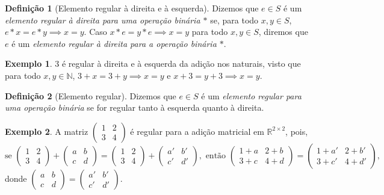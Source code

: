 \documentclass[a4paper,12pt]{article}
\theoremstyle{plain}
\theoremstyle{definition}
\newtheorem{definicao}{Definição}[section]
\newtheorem{exemplo}{Exemplo}[section]
\begin{document}
\begin{definicao}[Elemento regular à direita e à esquerda]
	Dizemos que \(e\in S\) é um \emph{elemento regular à direita para uma operação binária $*$} se, para todo $x,y \in S$, \(e*x = e*y \implies x = y\). Caso \(x*e = y*e \implies x = y\) para todo $x,y\in S$, diremos que $e$ é um \emph{elemento regular à direita para a operação binária $*$}.
\end{definicao}

\begin{exemplo}
	$3$ é regular à direita e à esquerda da adição nos naturais, visto que para todo $x,y\in \mathbb{N}$, $3+x = 3 + y \implies x = y$ e $x + 3 = y+3 \implies x =y$.
\end{exemplo}

\begin{definicao}[Elemento regular]
	Dizemos que \(e\in S\) é um \emph{elemento regular para uma operação binária} se for regular tanto à esquerda quanto à direita.
\end{definicao}

\begin{exemplo}
	A matriz $\begin{pmatrix}
		1&2\\
		3&4
	\end{pmatrix}$ é regular para a adição matricial em $\mathbb{R}^{2\times 2}$, pois,
	$
	\text{se }
	\begin{pmatrix}
		1&2\\
		3&4
	\end{pmatrix}
	+ \begin{pmatrix}
		a&b\\c&d
	\end{pmatrix}
	=\begin{pmatrix}
		1&2\\3&4
	\end{pmatrix}
	+ \begin{pmatrix}
		a'&b'\\c'&d'
	\end{pmatrix}, \text{ então }
	\begin{pmatrix}
		1+a&2+b\\3+c&4+d
	\end{pmatrix}
	= \begin{pmatrix}
		1+a'&2+b'\\3+c'&4+d'
	\end{pmatrix},
	$
	donde $\begin{pmatrix}
		a&b\\c&d
	\end{pmatrix}
	= \begin{pmatrix}
		a'&b'\\c'&d'
	\end{pmatrix}$.
\end{exemplo}
\end{document}
